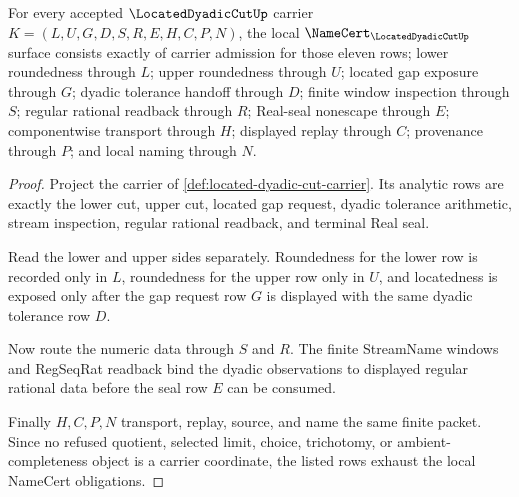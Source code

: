 \begin{theorem}
\label{thm:located-dyadic-cut-namecert-obligations}
For every accepted $\LocatedDyadicCutUp$ carrier $K=(L,U,G,D,S,R,E,H,C,P,N)$, the local $\NameCert_{\LocatedDyadicCutUp}$ surface consists exactly of carrier admission for those eleven rows; lower roundedness through $L$; upper roundedness through $U$; located gap exposure through $G$; dyadic tolerance handoff through $D$; finite window inspection through $S$; regular rational readback through $R$; Real-seal nonescape through $E$; componentwise transport through $H$; displayed replay through $C$; provenance through $P$; and local naming through $N$.
\end{theorem}
\begin{proof}
Project the carrier of \autoref{def:located-dyadic-cut-carrier}. Its analytic rows are exactly the lower cut, upper cut, located gap request, dyadic tolerance arithmetic, stream inspection, regular rational readback, and terminal Real seal.

Read the lower and upper sides separately. Roundedness for the lower row is recorded only in $L$, roundedness for the upper row only in $U$, and locatedness is exposed only after the gap request row $G$ is displayed with the same dyadic tolerance row $D$.

Now route the numeric data through $S$ and $R$. The finite StreamName windows and RegSeqRat readback bind the dyadic observations to displayed regular rational data before the seal row $E$ can be consumed.

Finally $H,C,P,N$ transport, replay, source, and name the same finite packet. Since no refused quotient, selected limit, choice, trichotomy, or ambient-completeness object is a carrier coordinate, the listed rows exhaust the local NameCert obligations.
\end{proof}

